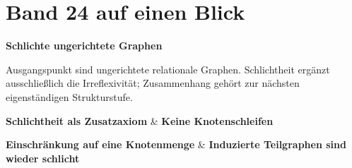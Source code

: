 \chapter[Band 24: Schlichte ungerichtete Graphen]{Band 24 auf einen Blick}
\noindent\textbf{Schlichte ungerichtete Graphen}\par\medskip
Ausgangspunkt sind ungerichtete relationale Graphen.
Schlichtheit ergänzt ausschließlich die Irreflexivität; Zusammenhang
gehört zur nächsten eigenständigen Strukturstufe.

\begin{BandUebersicht}
\textbf{Schlichtheit als Zusatzaxiom}
&
\textbf{Keine Knotenschleifen}
 \\
\addlinespace[.8ex]

\textbf{Einschränkung auf eine Knotenmenge}
&
\textbf{Induzierte Teilgraphen sind wieder schlicht}
\UebFormel{\begin{aligned}
&\SimpleUndirectedGraphStruct{V,E},\
 U\subseteq V\ \vdash\\
&\qquad\SimpleUndirectedGraphStruct{U,E[U]}.
\end{aligned}}
 \\
\addlinespace[.8ex]
\end{BandUebersicht}

